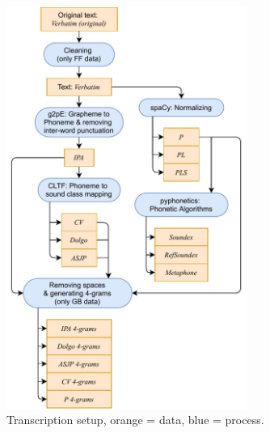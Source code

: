 \begin{figure}
  \centering
  \includegraphics[width=0.7\textwidth]{figures/transcription}
  \caption{Transcription setup, orange = data, blue = process.}
  \label{fig:transcription}
\end{figure}



